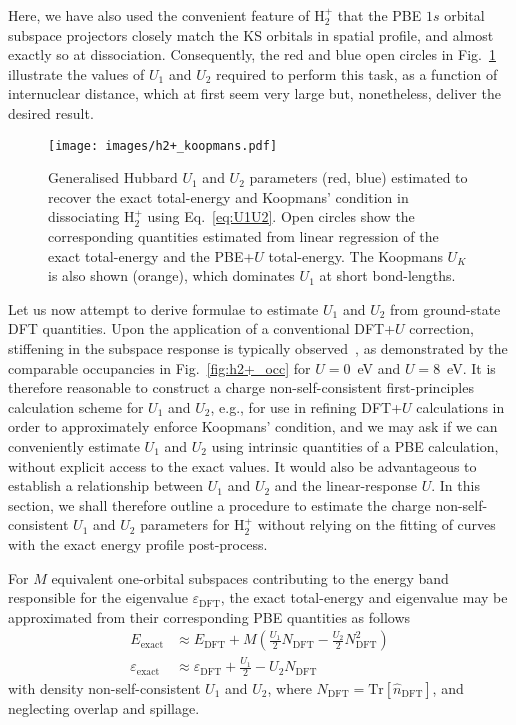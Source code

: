 Here, we have also used 
the convenient feature of H$_2^+$ 
that the PBE $1s$ orbital 
subspace projectors closely match
the KS orbitals in spatial profile, 
and almost exactly so at dissociation.
%
Consequently, the red and blue open circles in
Fig.~\ref{fig:h2+_koopmans} 
illustrate the values of 
$U_1$ and $U_2$ required to perform this task, 
as a function of internuclear distance, 
which at first seem very large but, 
nonetheless, deliver the desired result.

\begin{figure}[th!]
\centering
\texttt{[image: images/h2+\_koopmans.pdf]}
\caption[Estimated $U_1$ and $U_2$ parameters to restore 
exact total-energy and Koopmans' condition in dissociating H$_2^+$]{
Generalised Hubbard $U_1$ and $U_2$ parameters 
(red, blue) estimated to recover the exact total-energy 
and Koopmans' condition in dissociating H$_2^+$ 
using Eq.~\eqref{eq:U1U2}.
%
Open circles show the corresponding 
quantities estimated from linear regression 
of the exact total-energy and the PBE+$U$ total-energy. 
%
The Koopmans $U_K$ is also shown (orange), 
which dominates $U_1$ at short bond-lengths.
}
\label{fig:h2+_koopmans}
\end{figure}

Let us now attempt to derive formulae to estimate 
$U_1$ and $U_2$  
from ground-state DFT quantities.
%
Upon the application of a 
conventional DFT+$U$ correction, 
stiffening in the subspace response is typically 
observed~\cite{doi:10.1021/jp070549l,PhysRevLett.97.103001}, 
as demonstrated by the comparable 
occupancies in Fig.~\ref{fig:h2+_occ} 
for $U=0$~eV and $U=8$~eV.
%
It is therefore reasonable to construct 
a charge non-self-consistent first-principles
calculation scheme for  $U_1$ and $U_2$, 
e.g., for use in refining DFT+$U$ calculations in 
order to approximately enforce Koopmans' condition, 
and we may ask if we can conveniently 
estimate $U_1$ and $U_2$ 
using intrinsic quantities of a PBE calculation, 
without explicit access to the exact values.
%
It would also be advantageous to establish a relationship 
between $U_1$ and $U_2$ 
and the linear-response $U$.
%
In this section, 
we shall therefore outline a procedure 
to estimate the charge non-self-consistent 
$U_1$ and $U_2$ parameters for H$_2^+$ 
without relying on the fitting of curves 
with the exact energy profile post-process.

%
For $M$ equivalent one-orbital subspaces 
contributing to the energy band responsible for 
the eigenvalue  
$\varepsilon_{\textrm{DFT}}$, 
the exact total-energy and eigenvalue   
may be approximated from 
their corresponding PBE quantities 
as follows 
%
\begin{align}
\label{eq:e_approximated}
E_{\textrm{exact}} 
&\approx E_{\textrm{DFT} } + M\left( \frac{U_1}{2} N_{\textrm{DFT}} - \frac{U_2}{2} N_{\textrm{DFT}}^2\right)  \\[0.5em]
\varepsilon_{\textrm{exact}} 
&\approx \varepsilon_{\textrm{DFT}} + \frac{U_1}{2} -  U_2 N_{\textrm{DFT}}
\end{align}
%
with density non-self-consistent $U_1$ and $U_2$, 
where $N_\textrm{DFT} = \mathrm{Tr}  \left[ \hat{n}_\textrm{DFT} \right]$, 
and neglecting overlap and spillage.


